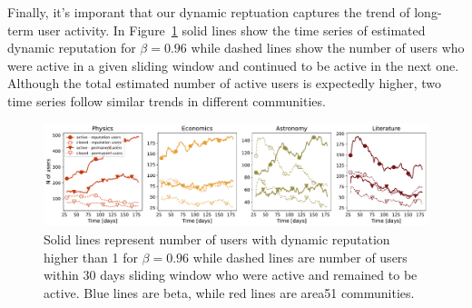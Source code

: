 Finally, it's imporant that our dynamic reptuation captures the trend of long-term user activity. In Figure~\ref{fig:active-users} solid lines show the time series of estimated dynamic reputation for $\beta = 0.96$ while dashed lines show the number of users who were active in a given sliding window and continued to be active in the next one. Although the total estimated number of active users is expectedly higher, two time series follow similar trends in different communities.

\begin{figure}[h!]
	\centering
	\includegraphics[width=1\linewidth]{figures/stackexchange/permanent_users.pdf}
	\caption{Solid lines represent number of users with dynamic reputation higher than 1 for $\beta=0.96$ while dashed lines are number of users within 30 days sliding window who were active and remained to be active. Blue lines are beta, while red lines are area51 communities.}
	\label{fig:active-users}
\end{figure}
\clearpage
